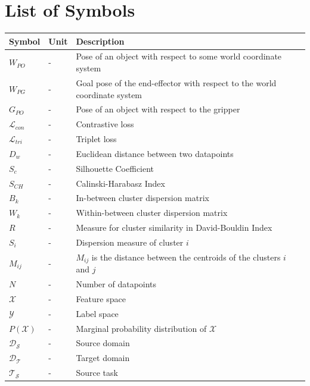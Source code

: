 \section*{List of Symbols}
\begin{table}[H]
    \setlength\extrarowheight{5pt}
    \centering
    \begin{tabular}{|p{70pt}|p{30pt}|p{350pt}|}
      \toprule
      Symbol	& Unit	& Description\\
      \midrule
      $W_{PO}$	& -	& Pose of an object with respect to some world coordinate
      system \\
      $W_{PG}$	& -	& Goal pose of the end-effector with respect to the world coordinate system \\
      $G_{PO}$	& -	& Pose of an object with respect to the gripper \\
      $\mathcal{L}_{con}$	& -	& Contrastive loss \\
      $\mathcal{L}_{tri}$	& -	& Triplet loss \\
      $\mathit{D_w}$ & - & Euclidean distance between two datapoints \\
      $\mathit{S_c}$ & - & Silhouette Coefficient \\
      $\mathit{S_{CH}}$ & - & Calinski-Harabasz Index \\
      $\mathit{B_k}$ & - & In-between cluster dispersion matrix \\
      $\mathit{W_k}$ & - & Within-between cluster dispersion matrix \\
      $\mathit{R}$ & - & Measure for cluster similarity in David-Bouldin Index \\
      $\mathit{S_i}$ & - & Dispersion measure of cluster $i$ \\
      $ \mathit{M_{ij}}$ & - & $M_{ij}$ is the distance between the centroids of the clusters $i$ and $j$ \\
      $ \mathit{N}$ & - & Number of datapoints \\
      $ \mathcal{X}$ & - & Feature space \\
      $ \mathit{\mathcal{Y}}$& - & Label space \\ 
      $ \mathit{P(\mathcal{X})}$ & - & Marginal probability distribution of $\mathcal{X}$ \\
      $ \mathit{\mathcal{D_S}}$ & - & Source domain \\
      $ \mathit{\mathcal{D_T}}$ & - & Target domain \\
      $ \mathit{\mathcal{T_S}}$ & - & Source task \\

\end{tabular}
\end{table}
